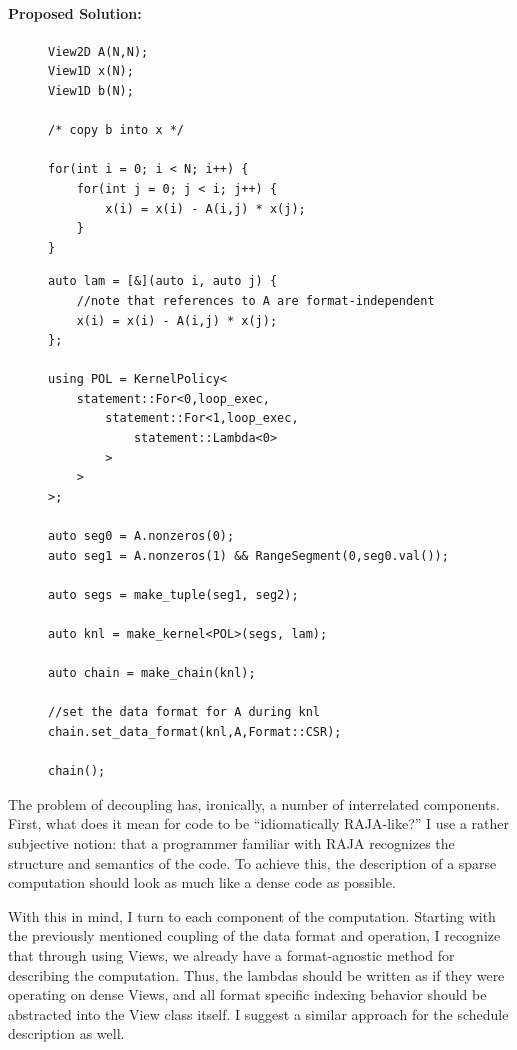 \documentclass{article}
\begin{document}
\paragraph{Proposed Solution:}


\begin{figure}
\begin{lstlisting}[label={ForwardSolveC},caption={C-like implementation of forward substitution using Views}]
View2D A(N,N);
View1D x(N);
View1D b(N);

/* copy b into x */

for(int i = 0; i < N; i++) {
    for(int j = 0; j < i; j++) {
        x(i) = x(i) - A(i,j) * x(j);
    }
}
\end{lstlisting}
\end{figure}


\begin{figure}
\begin{lstlisting}[caption={Possible RAJA implementation of forward substitution.},label={ForwardSolveRAJA}]
auto lam = [&](auto i, auto j) {
    //note that references to A are format-independent
    x(i) = x(i) - A(i,j) * x(j);
};

using POL = KernelPolicy<
    statement::For<0,loop_exec,
        statement::For<1,loop_exec,
            statement::Lambda<0>
        >
    >
>;

auto seg0 = A.nonzeros(0);
auto seg1 = A.nonzeros(1) && RangeSegment(0,seg0.val());

auto segs = make_tuple(seg1, seg2);

auto knl = make_kernel<POL>(segs, lam);

auto chain = make_chain(knl);

//set the data format for A during knl
chain.set_data_format(knl,A,Format::CSR);

chain();

\end{lstlisting}
\end{figure}

The problem of decoupling has, ironically, a number of interrelated components.
First, what does it mean for code to be \enquote{idiomatically RAJA-like?}
I use a rather subjective notion: that a programmer familiar with RAJA recognizes the structure and semantics of the code. 
To achieve this, the description of a sparse computation should look as much like a dense code as possible. 

With this in mind, I turn to each component of the computation.
Starting with the previously mentioned coupling of the data format and operation, I recognize that through using Views, we already have a format-agnostic method for describing the computation. 
Thus, the lambdas should be written as if they were operating on dense Views, and all format specific indexing behavior should be abstracted into the View class itself. 
I suggest a similar approach for the schedule description as well.
\end{document}
